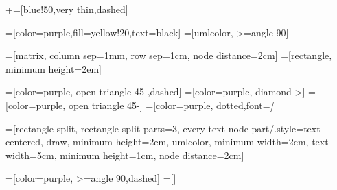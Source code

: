 \makeatletter
\usetikzlibrary{arrows,shapes.multipart,backgrounds,fit}
+=[blue!50,very thin,dashed]


\newcommand{\umltextcolor}{black}
\newcommand{\umldrawcolor}{purple}
\newcommand{\umlfillcolor}{yellow!20}
=[color=\umldrawcolor,fill=\umlfillcolor,text=\umltextcolor]
=[umlcolor, >=angle 90]

=[matrix, column sep=1mm, row sep=1cm, node distance=2cm]
=[rectangle, minimum height=2em]

=[color=\umldrawcolor, open triangle 45-,dashed]
=[color=\umldrawcolor, diamond->]
=[color=\umldrawcolor, open triangle 45-]
=[color=\umldrawcolor, dotted,font=\itshape]

=[rectangle split, rectangle split parts=3,
every text node part/.style={text centered},
draw, minimum height=2em, umlcolor, minimum width=2cm, text width=5cm,
minimum height=1cm, node distance=2cm]


=[color=\umldrawcolor, >=angle 90,dashed]
=[]
\newif\ifsimplified\simplifiedtrue




\def\umlcdPackageFit{}

\newenvironment{class}[3][]%
{
\begin{classAndInterfaceCommon}{#1}{#2}{#3}
}%
{\calcuateNumberOfParts{}
\node[this umlcd style, anchor=north] (\umlcdClassName) at (\umlcdClassPos)
    {\classnamestyle{\umlcdClassName}
\insertAttributesAndOperations{}
};

\end{classAndInterfaceCommon}
}

\newenvironment{interface}[3][]%
{
\begin{classAndInterfaceCommon}{#1}{#2}{#3}
}%
{\calcuateNumberOfParts{}
\node[this umlcd style, anchor=north] (\umlcdClassName) at (\umlcdClassPos)
    {$<<$interface$>>$ \\ \textbf{\umlcdClassName}
\insertAttributesAndOperations{}
};

\end{classAndInterfaceCommon}
}

